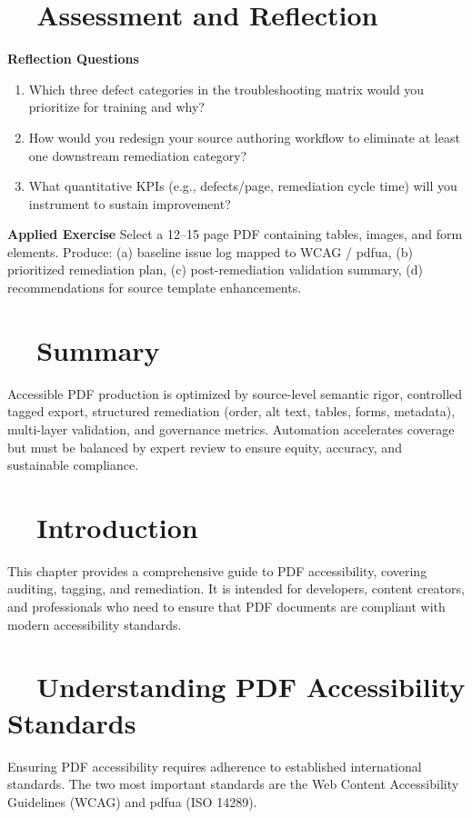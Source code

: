 \section{~~Assessment and Reflection}\label{ch18:sec:assessment-reflection}
\textbf{Reflection Questions}
\begin{enumerate}
	\item Which three defect categories in the troubleshooting matrix would you prioritize for training and why?
	\item How would you redesign your source authoring workflow to eliminate at least one downstream remediation category?
	\item What quantitative KPIs (e.g., defects/page, remediation cycle time) will you instrument to sustain improvement?
\end{enumerate}
\textbf{Applied Exercise} Select a 12–15 page PDF containing tables, images, and form elements. Produce: (a) baseline issue log mapped to WCAG / \gls{pdfua}, (b) prioritized remediation plan, (c) post-remediation validation summary, (d) recommendations for source template enhancements.

\section{~~Summary}\label{ch18:sec:summary}
Accessible PDF production is optimized by source-level semantic rigor, controlled tagged export, structured remediation (order, alt text, tables, forms, metadata), multi-layer validation, and governance metrics. Automation accelerates coverage but must be balanced by expert review to ensure equity, accuracy, and sustainable compliance.
\label{chap:pdf-accessibility-report}

\section{~~Introduction}
\label{sec:pdf-report-introduction}
This chapter provides a comprehensive guide to PDF accessibility, covering auditing, tagging, and remediation. It is intended for developers, content creators, and  professionals who need to ensure that PDF documents are compliant with modern accessibility standards.

\section{~~Understanding PDF Accessibility Standards}
\label{sec:pdf-accessibility-standards}
Ensuring PDF accessibility requires adherence to established international standards. The two most important standards are the Web Content Accessibility Guidelines (WCAG) and \gls{pdfua} (ISO 14289).

